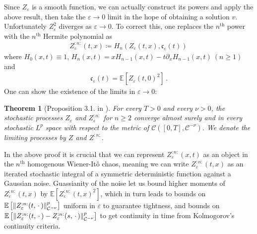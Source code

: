 \documentclass{report}
\DeclarePairedDelimiter\norm{\lVert}{\rVert}%
\newcommand{\Exp}[1]{\mathbb{E}\left[#1\right]}
\newcommand{\Placeholder}{\,\mathrel{\cdot}\,}
\DeclareMathOperator{\DefiningEquality}{\coloneqq}
\newtheorem{theorem}{Theorem}[chapter]
\theoremstyle{remark}
\theoremstyle{definition}
\let\epsilon\varepsilon
\begin{document}
Since $Z_\epsilon$ is a smooth function, we can actually construct its powers and apply the above result, then take the $\epsilon \to 0$ limit in the hope of obtaining a solution $v$. Unfortunately $Z_\epsilon^2$ diverges as $\epsilon \to 0$. To correct this, one replaces the $n^\text{th}$ power with the $n^\text{th}$ Hermite polynomial as
\begin{align}
  Z_\epsilon^{:n:}(t, x) \DefiningEquality H_n(Z_\epsilon(t, x), \mathfrak{c}_\epsilon(t))\,
\end{align}
where $H_0(x, t) \equiv 1$, $H_{n}(x, t) = x H_{n-1}(x, t) - t \partial_x H_{n-1}(x, t)~(n \ge 1)$ and
\begin{align*}
  \mathfrak{c}_\epsilon(t) = \Exp{Z_\epsilon(t, 0)^2}\,.
\end{align*}
One can show the existence of the limits in $\epsilon \to 0$:
\begin{theorem}[Proposition 3.1. in \cite{mourrat2015convergencetwodimensionaldynamicisingkac}]
  For every $T > 0$ and every $\nu > 0$, the stochastic processes $Z_\epsilon$ and $Z_\epsilon^{:n:}$ for $n \ge 2$ converge almost surely and in every stochastic $L^p$ space with respect to the metric of $\mathcal{C}([0, T], \mathcal{C}^{-\nu})$. We denote the limiting processes by $Z$ and $Z^{:n:}$.
\end{theorem}
In the above proof it is crucial that we can represent $Z_\epsilon^{:n:}(x, t)$ as an object in the $n^\text{th}$ homogenous Wiener-Itô chaos, meaning we can write $Z_\epsilon^{:n:}(t, x)$ as an iterated stochastic integral of a symmetric deterministic function against a Gaussian noise. Guassianity of the noise let us bound higher moments of $Z_\epsilon^{:n:}(t, x)$ by $\Exp{Z_\epsilon^{:n:}(t, x)^2}$, which in turn leads to bounds on $\Exp{\norm{Z_\epsilon^{:n:}(t, \Placeholder)}^p_{\mathcal{C}^{-\nu}}}$ uniform in $\epsilon$ to guarantee tightness, and bounds on $\Exp{\norm{Z_\epsilon^{:n:}(t, \Placeholder) - Z_\epsilon^{:n:}(s, \Placeholder)}^p_{\mathcal{C}^{-\nu}}}$ to get continuity in time from Kolmogorov's continuity criteria.
\end{document}
